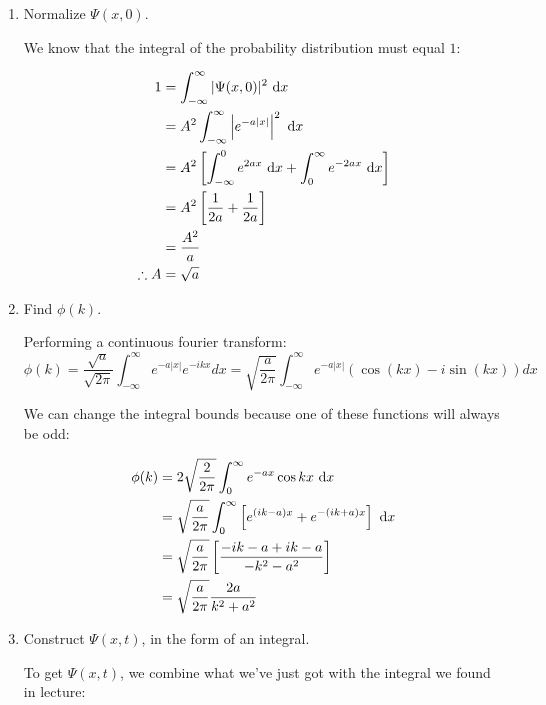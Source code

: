 \documentclass{article}
\begin{document}
\begin{enumerate}[label=(\alph*)]
\item Normalize $\Psi(x, 0)$. 


    \begin{solution}
        We know that the integral of the probability distribution must equal $1$:

        \begin{align*}
            1 &= \int_{-\infty}^{\infty} |\Psi(x, 0)|^2 \ \mathrm d x \\
            &= A^2 \int_{-\infty}^{\infty} \left|e^{-a|x|}\right|^2 \ \mathrm d x\\
            &= A^2\left[\int_{-\infty}^0 e^{2ax} \ \mathrm d x + \int_0^\infty e^{-2ax} \ \mathrm d x\right]\\
            &= A^2\left[\frac{1}{2a} + \frac{1}{2a} \right]\\
            &= \frac{A^2}{a}\\
            \therefore A &= \sqrt{a}
        \end{align*}

    \end{solution}
\item Find $\phi(k)$.

\begin{solution}
    Performing a continuous fourier transform:
    \[\phi(k) = \frac{\sqrt{a}}{\sqrt{2\pi}}\int_{-\infty}^{\infty}e^{-a|x|}e^{-ikx}dx = \sqrt{\frac{a}{2\pi}}\int_{-\infty}^{\infty}e^{-a|x|}(\cos(kx) - i\sin(kx))dx\]

    We can change the integral bounds because one of these functions will always be odd:

    \begin{align*}
        \phi(k) &= 2\sqrt{\frac{2}{2\pi}} \int_0^\infty e^{-ax} \cos kx \ \mathrm d x\\
        &= \sqrt{\frac{a}{2\pi}} \int_0^\infty \left[e^{(ik - a)x} + e^{-(ik + a)x} \right]\ \mathrm d x\\
        &= \sqrt{\frac{a}{2\pi}} \left[\frac{-ik - a + ik - a}{-k^2 - a^2}\right]\\
        &= \sqrt{\frac{a}{2\pi}}  \frac{2a}{k^2 + a^2}
    \end{align*} 
\end{solution}
\item Construct $\Psi(x, t)$, in the form of an integral.

\begin{solution}
    To get $\Psi(x, t)$, we combine what we've just got with the integral we found in lecture:


\end{solution}
\end{enumerate}
\end{document}

